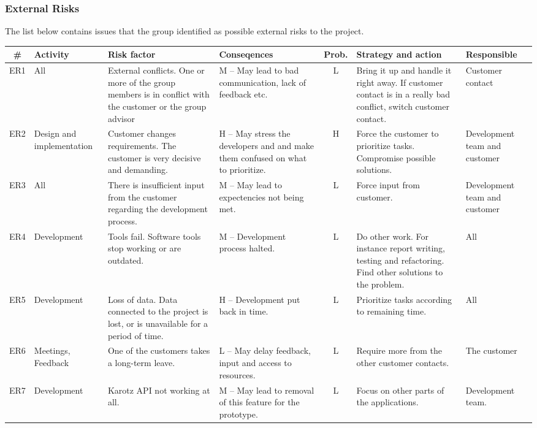 \subsubsection{External Risks}
The list below contains issues that the group identified as possible external risks to the project.

\begin{landscape}
\begin{table}[h]
\begin{tabular}{  c 	 	p{1.8cm} 	 	p{4.0cm} 	 	p{4.0cm} 	  	c 	 	p{4.0cm} 	 	p{1.8cm} }
\hline
  \# & Activity 	& Risk factor 	& Conseqences 	& Prob.& Strategy and action 							& Responsible \\
\hline
  ER1 & All		& External conflicts. One or more of the group members is in conflict with the customer or the group advisor & M -- May lead to bad communication, lack of feedback etc. & L 	& Bring it up and handle it right away. If customer contact is in a really bad conflict, switch customer contact.	& Customer contact \\
\hline
  ER2 & Design and implementation	& Customer changes requirements. The customer is very decisive and demanding. & H -- May stress the developers and and make them confused on what to prioritize.  & H	&  Force the customer to prioritize tasks. Compromise possible solutions. 	& Development team and customer \\
\hline
  ER3 & All		& There is insufficient input from the customer regarding the development process.  & M -- May lead to expectencies not being met.  & L &  Force input from customer.	& Development team and customer \\
\hline
  ER4 & Development	& Tools fail. Software tools stop working or are outdated. 	& M -- Development process halted.  & L	&  Do other work. For instance report writing, testing and refactoring. Find other solutions to the problem. & All \\
\hline
  ER5 & Development & Loss of data. Data connected to the project is lost, or is unavailable for a period of time.   & H -- Development put back in time. & L &  Prioritize tasks according to remaining time. 	& All \\
\hline
  ER6 & Meetings, Feedback	& One of the customers takes a long-term leave. & L -- May delay feedback, input and access to resources. & L & Require more from the other customer contacts. 	& The customer \\
\hline
  ER7 & Development & Karotz API not working at all. & M -- May lead to removal of this feature for the prototype. & L	&  Focus on other parts of the applications.  & Development team. \\

\end{tabular}
\end{table}
\end{landscape}
